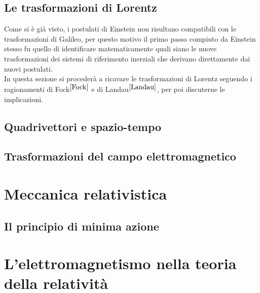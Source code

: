 \documentclass[12pt,a4paper]{book}
\numberwithin{equation}{section}
\begin{document}
\begin{sloppypar}
\section{Le trasformazioni di Lorentz}
Come si è già visto, i postulati di Einstein non risultano compatibili con le trasformazioni di Galileo, 
per questo motivo il primo passo compiuto da Einstein stesso fu quello di identificare matematicamente quali siano 
le nuove trasformazioni dei sistemi di riferimento inerziali che derivano direttamente dai nuovi postulati.\\
In questa sezione si procederà a ricavare le trasformazioni di Lorentz seguendo i ragionamenti di Fock$^{\cite{Fock}}$ e di Landau$ ^{\cite{Landau}}$, 
per poi discuterne le implicazioni.  




\section{Quadrivettori e spazio-tempo}
\label{sec:4-vettori}


\section{Trasformazioni del campo elettromagnetico}


\chapter{Meccanica relativistica}
\section{Il principio di minima azione}




\chapter{L'elettromagnetismo nella teoria della relatività}

\appendix





\end{sloppypar}
\end{document}

